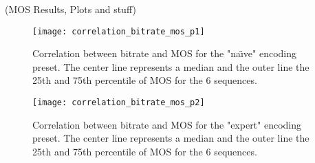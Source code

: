 (MOS Results, Plots and stuff)

\begin{figure}[!t]
	\centering
	\texttt{[image: correlation\_bitrate\_mos\_p1]}
	\caption{Correlation between bitrate and MOS for the "na\"{\i}ve" encoding preset. The center line represents a median and the outer line the 25th and 75th percentile of MOS for the 6 sequences.}
	\label{fig:result:correlation_bitrate_mos}
\end{figure}

\begin{figure}[!t]
\centering
\texttt{[image: correlation\_bitrate\_mos\_p2]}
\caption{Correlation between bitrate and MOS for the "expert" encoding preset. The center line represents a median and the outer line the 25th and 75th percentile of MOS for the 6 sequences.}
\label{fig:result:correlation_bitrate_mos}
\end{figure}
